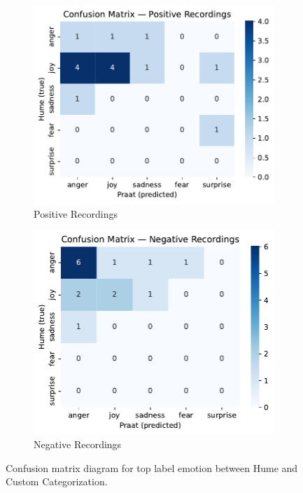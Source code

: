 \begin{figure}[H]
    \centering 
    \begin{subfigure}[b]{0.45\textwidth}
        \includegraphics[width=\textwidth]{png/results/rq1_nr3/confusion_matrix_Positive_Recordings.pdf}
        \caption{Positive Recordings}
        \label{fig:rq1_conf_pos}
    \end{subfigure}
    \begin{subfigure}[b]{0.45\textwidth}
        \includegraphics[width=\textwidth]{png/results/rq1_nr3/confusion_matrix_Negative_Recordings.pdf}
        \caption{Negative Recordings}
        \label{fig:rq1_conf_neg}
    \end{subfigure}
    \caption{Confusion matrix diagram for top label emotion between Hume and Custom Categorization.}
    \label{fig:rq1_conf_matx_full}
\end{figure}

